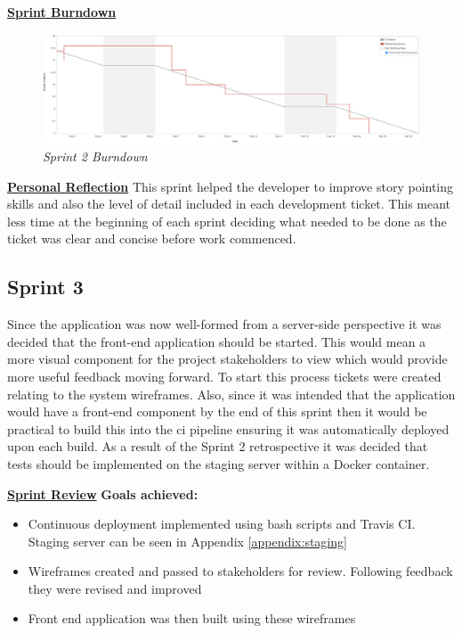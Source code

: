 \underline{\textbf{Sprint Burndown}}\newline
\begin{figure}[!ht]
\centering
\includegraphics*[width=\textwidth]{images/sprint2}
\caption{\em Sprint 2 Burndown}
\label{fig:sprint2}
\end{figure}

\underline{\textbf{Personal Reflection}}\newline
This sprint helped the developer to improve story pointing skills and also the level of detail included in each development ticket. This meant less time at the beginning of each sprint deciding what needed to be done as the ticket was clear and concise before work commenced.

\subsection{Sprint 3}
Since the application was now well-formed from a server-side perspective it was decided that the front-end application should be started. This would mean a more visual component for the project stakeholders to view which would provide more useful feedback moving forward. To start this process tickets were created relating to the system wireframes. Also, since it was intended that the application would have a front-end component by the end of this sprint then it would be practical to build this into the \gls{ci} pipeline ensuring it was automatically deployed upon each build. As a result of the Sprint 2 retrospective it was decided that tests should be implemented on the staging server within a \gls{Docker container}.

\underline{\textbf{Sprint Review}}\newline
\textbf{Goals achieved:}
\begin{itemize}
	\item Continuous deployment implemented using bash scripts and Travis CI. Staging server can be seen in Appendix \ref{appendix:staging}
	\item Wireframes created and passed to stakeholders for review. Following feedback they were revised and improved
	\item Front end application was then built using these wireframes
\end{itemize}

